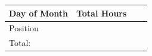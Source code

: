 \documentclass{article}
\begin{document}
\vspace{1mm}
\begin{table}[htbp]
\begin{tabular}{ | C{2cm} | C{1cm} |  L{12.5cm} | N}
\hline
Day of Month & Total Hours & & \\[10pt] \hline
Position & & \\[10pt] \hline


  
Total: & & \\[10pt] \hline

\end{tabular}
\label{tab:table}
\end{table}
\end{document}
